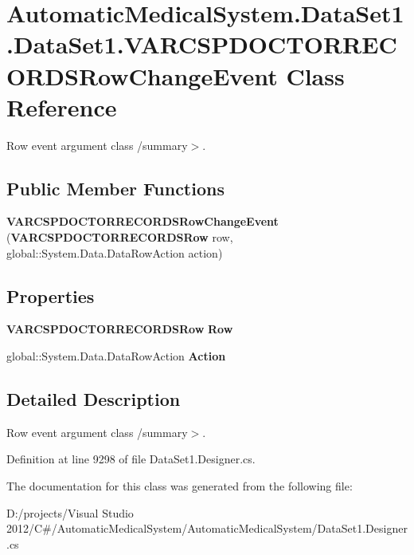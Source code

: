 \section{AutomaticMedicalSystem.DataSet1.DataSet1.VARCSPDOCTORRECORDSRowChangeEvent Class Reference}
\label{class_automatic_medical_system_1_1_data_set1_1_1_v_a_r_c_s_p_d_o_c_t_o_r_r_e_c_o_r_d_s_row_change_event}
Row event argument class /summary$>$.  


\subsection*{Public Member Functions}
\begin{CompactItemize}
\item 
\textbf{VARCSPDOCTORRECORDSRowChangeEvent} ({\bf VARCSPDOCTORRECORDSRow} row, global::System.Data.DataRowAction action)\label{class_automatic_medical_system_1_1_data_set1_1_1_v_a_r_c_s_p_d_o_c_t_o_r_r_e_c_o_r_d_s_row_change_event_e6ed284ccedaf701ef424fdb95ef5fd7}

\end{CompactItemize}
\subsection*{Properties}
\begin{CompactItemize}
\item 
{\bf VARCSPDOCTORRECORDSRow} \textbf{Row}\hspace{0.3cm}{\tt  [get]}\label{class_automatic_medical_system_1_1_data_set1_1_1_v_a_r_c_s_p_d_o_c_t_o_r_r_e_c_o_r_d_s_row_change_event_2b9df025959eba95a0a2d7b8bac4d738}

\item 
global::System.Data.DataRowAction \textbf{Action}\hspace{0.3cm}{\tt  [get]}\label{class_automatic_medical_system_1_1_data_set1_1_1_v_a_r_c_s_p_d_o_c_t_o_r_r_e_c_o_r_d_s_row_change_event_9bbe129b649ec7c414d22d67df26484c}

\end{CompactItemize}


\subsection{Detailed Description}
Row event argument class /summary$>$. 

Definition at line 9298 of file DataSet1.Designer.cs.

The documentation for this class was generated from the following file:\begin{CompactItemize}
\item 
D:/projects/Visual Studio 2012/C\#/AutomaticMedicalSystem/AutomaticMedicalSystem/DataSet1.Designer.cs\end{CompactItemize}
